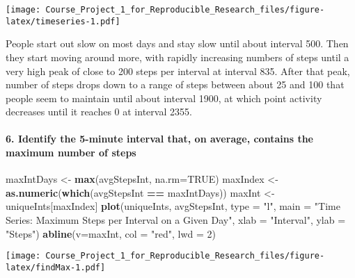 \documentclass[]{article}
\newenvironment{Shaded}{\begin{snugshade}}{\end{snugshade}}
\newcommand{\KeywordTok}[1]{\textcolor[rgb]{0.13,0.29,0.53}{\textbf{#1}}}
\newcommand{\DataTypeTok}[1]{\textcolor[rgb]{0.13,0.29,0.53}{#1}}
\newcommand{\DecValTok}[1]{\textcolor[rgb]{0.00,0.00,0.81}{#1}}
\newcommand{\StringTok}[1]{\textcolor[rgb]{0.31,0.60,0.02}{#1}}
\newcommand{\OtherTok}[1]{\textcolor[rgb]{0.56,0.35,0.01}{#1}}
\newcommand{\OperatorTok}[1]{\textcolor[rgb]{0.81,0.36,0.00}{\textbf{#1}}}
\newcommand{\NormalTok}[1]{#1}
\let\oldparagraph\paragraph
\renewcommand{\paragraph}[1]{\oldparagraph{#1}\mbox{}}
\begin{document}
\texttt{[image: Course\_Project\_1\_for\_Reproducible\_Research\_files/figure-latex/timeseries-1.pdf]}

\begin{Shaded}
\end{Shaded}

People start out slow on most days and stay slow until about interval
500. Then they start moving around more, with rapidly increasing numbers
of steps until a very high peak of close to 200 steps per interval at
interval 835. After that peak, number of steps drops down to a range of
steps between about 25 and 100 that people seem to maintain until about
interval 1900, at which point activity decreases until it reaches 0 at
interval 2355.

\paragraph{6. Identify the 5-minute interval that, on average, contains
the maximum number of
steps}\label{identify-the-5-minute-interval-that-on-average-contains-the-maximum-number-of-steps}

\begin{Shaded}
\begin{Highlighting}[]
\NormalTok{maxIntDays <-}\StringTok{ }\KeywordTok{max}\NormalTok{(avgStepsInt, }\DataTypeTok{na.rm=}\OtherTok{TRUE}\NormalTok{)}
\NormalTok{maxIndex <-}\StringTok{ }\KeywordTok{as.numeric}\NormalTok{(}\KeywordTok{which}\NormalTok{(avgStepsInt }\OperatorTok{==}\StringTok{ }\NormalTok{maxIntDays))}
\NormalTok{maxInt <-}\StringTok{ }\NormalTok{uniqueInts[maxIndex]}
\KeywordTok{plot}\NormalTok{(uniqueInts, avgStepsInt, }\DataTypeTok{type =} \StringTok{"l"}\NormalTok{,}
     \DataTypeTok{main =} \StringTok{"Time Series: Maximum Steps per Interval on a Given Day"}\NormalTok{,}
     \DataTypeTok{xlab =} \StringTok{"Interval"}\NormalTok{, }\DataTypeTok{ylab =} \StringTok{"Steps"}\NormalTok{)}
\KeywordTok{abline}\NormalTok{(}\DataTypeTok{v=}\NormalTok{maxInt, }\DataTypeTok{col =} \StringTok{"red"}\NormalTok{, }\DataTypeTok{lwd =} \DecValTok{2}\NormalTok{)}
\end{Highlighting}
\end{Shaded}

\texttt{[image: Course\_Project\_1\_for\_Reproducible\_Research\_files/figure-latex/findMax-1.pdf]}
\end{document}
